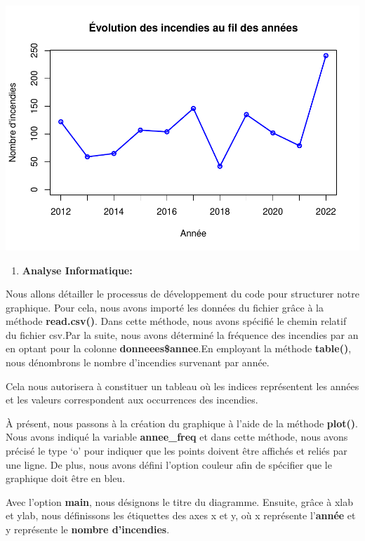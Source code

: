 \documentclass[
]{article}
\providecommand{\tightlist}{%
  \setlength{\itemsep}{0pt}\setlength{\parskip}{0pt}}
\begin{document}
\includegraphics{Rapport_files/figure-latex/setup-1.pdf}

\begin{enumerate}
\def\labelenumi{\arabic{enumi}.}
\tightlist
\item
  \textbf{Analyse Informatique:}
\end{enumerate}

Nous allons détailler le processus de développement du code pour
structurer notre graphique. Pour cela, nous avons importé les données du
fichier grâce à la méthode \textbf{read.csv()}. Dans cette méthode, nous
avons spécifié le chemin relatif du fichier csv.Par la suite, nous avons
déterminé la fréquence des incendies par an en optant pour la colonne
\textbf{donneees\$annee}.En employant la méthode \textbf{table()}, nous
dénombrons le nombre d'incendies survenant par année.

Cela nous autorisera à constituer un tableau où les indices représentent
les années et les valeurs correspondent aux occurrences des incendies.

À présent, nous passons à la création du graphique à l'aide de la
méthode \textbf{plot()}. Nous avons indiqué la variable
\textbf{annee\_freq} et dans cette méthode, nous avons précisé le type
`o' pour indiquer que les points doivent être affichés et reliés par une
ligne. De plus, nous avons défini l'option couleur afin de spécifier que
le graphique doit être en bleu.

Avec l'option \textbf{main}, nous désignons le titre du diagramme.
Ensuite, grâce à xlab et ylab, nous définissons les étiquettes des axes
x et y, où x représente l'\textbf{année} et y représente le
\textbf{nombre d'incendies}.
\end{document}
